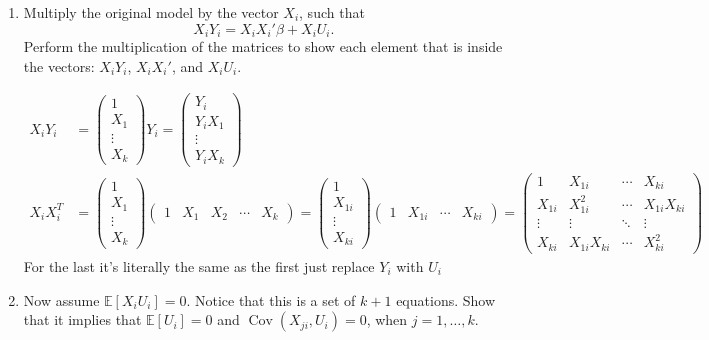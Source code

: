 \documentclass[11pt]{article}
\begin{document}
\begin{enumerate}[label=(\alph*)]
    \item Multiply the original model by the vector \( X_i \), such that
    \[
    X_i Y_i = X_i X_i' \beta + X_i U_i.
    \]
    Perform the multiplication of the matrices to show each element that is inside the vectors: \( X_i Y_i \), \( X_i X_i' \), and \( X_i U_i \).
    \begin{solution}
        \begin{align*}
            X_i Y_i &=\begin{pmatrix}
                1 \\ X_1 \\\vdots \\ X_k
            \end{pmatrix} Y_i = \begin{pmatrix}
                Y_i \\ Y_iX_1 \\\vdots \\ Y_iX_k
            \end{pmatrix} \\
            X_iX_i^T &= \begin{pmatrix}
                1 \\ X_1 \\\vdots \\ X_k
            \end{pmatrix}\begin{pmatrix}
    1 & X_1 & X_2 & \cdots &X_k
        \end{pmatrix} = \begin{pmatrix}
1 \\
X_{1i} \\
\vdots \\
X_{ki}
\end{pmatrix}
\begin{pmatrix}
1 & X_{1i} & \cdots & X_{ki}
\end{pmatrix}
=
\begin{pmatrix}
1 & X_{1i} & \cdots & X_{ki} \\
X_{1i} & X_{1i}^2 & \cdots & X_{1i} X_{ki} \\
\vdots & \vdots & \ddots & \vdots \\
X_{ki} & X_{1i} X_{ki} & \cdots & X_{ki}^2
\end{pmatrix}
        \end{align*}
        For the last it's literally the same as the first just replace $Y_i$ with $U_i$
    \end{solution}
    \item Now assume \( \mathbb{E}[X_i U_i] = 0 \). Notice that this is a set of \( k+1 \) equations. Show that it implies that \( \mathbb{E}[U_i] = 0 \) and \( \operatorname{Cov}(X_{ji}, U_i) = 0 \), when \( j = 1, \ldots, k \).

\end{enumerate}
\end{document}
